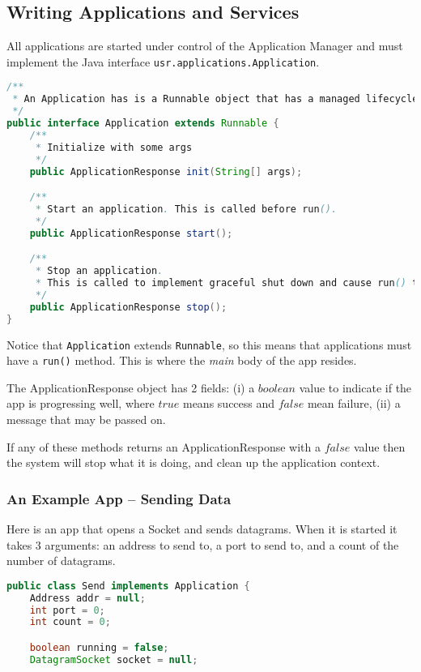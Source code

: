 \subsection{Writing Applications and Services}

All applications are started under control of the Application Manager
and must implement the  Java interface \texttt{usr.applications.Application}.

\begin{lstlisting}[language=java,frame=single]
/**
 * An Application has is a Runnable object that has a managed lifecycle.
 */
public interface Application extends Runnable {
    /**
     * Initialize with some args
     */
    public ApplicationResponse init(String[] args);

    /**
     * Start an application. This is called before run().
     */
    public ApplicationResponse start();

    /**
     * Stop an application.
     * This is called to implement graceful shut down and cause run() to end.
     */
    public ApplicationResponse stop();
}
\end{lstlisting}

\noindent Notice that \texttt{Application} extends \texttt{Runnable},
so this means that applications must have a \texttt{run()} method.
This is where the \emph{main} body of the app resides.

The ApplicationResponse object has 2 fields: (i) a $boolean$
value to indicate if the app is progressing well, where $true$ means
success and $false$ mean failure, (ii) a message that may be passed
on.

If any of these methods returns an ApplicationResponse with a
$false$ value then the system will stop what it is doing, and clean up
the application context.

\subsubsection{An Example App -- Sending Data}

Here is an app that opens a Socket and sends datagrams.
When it is started it takes 3 arguments: an address to send to, a port
to send to, and a count of the number of datagrams.

\begin{lstlisting}[language=java,frame=single]
public class Send implements Application {
    Address addr = null;
    int port = 0;
    int count = 0;

    boolean running = false;
    DatagramSocket socket = null;
    
\end{lstlisting}


